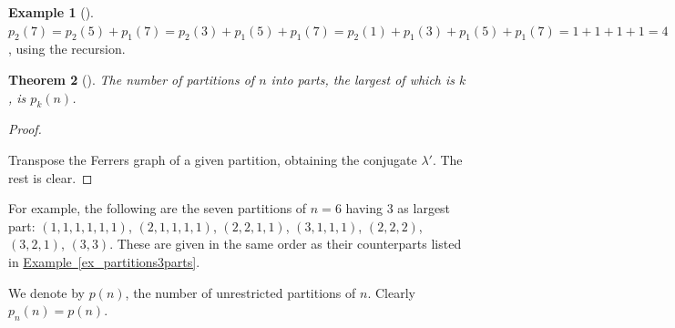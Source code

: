 \documentclass[10pt,]{book}
\theoremstyle{plain}
\newtheorem{theorem}{Theorem}[section]
\theoremstyle{definition}
\theoremstyle{definition}
\newtheorem{example}[theorem]{Example}
\theoremstyle{definition}
\theoremstyle{definition}
\numberwithin{equation}{chapter}
\begin{document}
\begin{example}[]\label{example-29}
\hypertarget{p-1119}{}%
\(p_2(7) = p_2(5) + p_1(7) = p_2(3) + p_1(5) + p_1(7) = p_2(1) + p_1(3) + p_1(5) + p_1(7) = 1 + 1 + 1 + 1 = 4\), using the recursion.%
\end{example}
\begin{theorem}[{}]\label{thm-largestpart}
\hypertarget{p-1120}{}%
The number of partitions of \(n\) into parts, the largest of which is \(k\), is \(p_k(n)\).%
\end{theorem}
\begin{proof}\hypertarget{proof-16}{}
\hypertarget{p-1121}{}%
Transpose the Ferrers graph of a given partition, obtaining the conjugate \(\lambda'\).  The rest is clear.%
\end{proof}
\hypertarget{p-1122}{}%
For example, the following are the seven partitions of \(n = 6\) having 3 as largest part: \((1,1,1,1,1,1)\), \((2,1,1,1,1)\), \((2,2,1,1)\), \((3,1,1,1)\), \((2,2,2)\), \((3,2,1)\), \((3,3)\).  These are given in the same order as their counterparts listed in \hyperref[ex_partitions3parts]{Example~\ref{ex_partitions3parts}}.%
\par
\hypertarget{p-1123}{}%
We denote by \(p(n)\), the number of unrestricted partitions of \(n\).  Clearly \(p_n(n) = p(n)\).%
\typeout{************************************************}
\typeout{************************************************}
\end{document}
